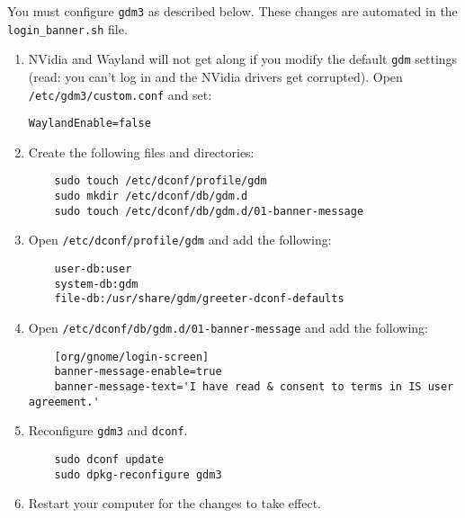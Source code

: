 You must configure \texttt{gdm3} as described below. These changes are automated in the \texttt{login\_banner.sh} file.

\begin{enumerate}
  \item NVidia and Wayland will not get along if you modify the default \texttt{gdm} settings (read: you can't log in and the NVidia drivers get corrupted). Open \texttt{/etc/gdm3/custom.conf} and set:

    \texttt{WaylandEnable=false}

  \item Create the following files and directories:
	\begin{verbatim}
	sudo touch /etc/dconf/profile/gdm
	sudo mkdir /etc/dconf/db/gdm.d
	sudo touch /etc/dconf/db/gdm.d/01-banner-message
	\end{verbatim}

  \item Open \texttt{/etc/dconf/profile/gdm} and add the following:
	\begin{verbatim}
	user-db:user
	system-db:gdm
	file-db:/usr/share/gdm/greeter-dconf-defaults
	\end{verbatim}

  \item Open \texttt{/etc/dconf/db/gdm.d/01-banner-message} and add the following:
	\begin{verbatim}
	[org/gnome/login-screen]
	banner-message-enable=true
	banner-message-text='I have read & consent to terms in IS user agreement.'
	\end{verbatim}

  \item Reconfigure \texttt{gdm3} and \texttt{dconf}.
	\begin{verbatim}
	sudo dconf update
	sudo dpkg-reconfigure gdm3
	\end{verbatim}

  \item Restart your computer for the changes to take effect.
\end{enumerate}

